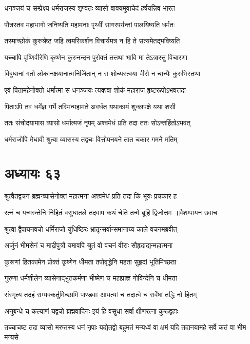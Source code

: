 \twolineshloka
{धनञ्जयं च सम्प्रेक्ष्य धर्मराजस्य शृण्वतः}
{व्यासो वाक्यमुवाचेदं हर्षयन्निव भारत}


\twolineshloka
{पौत्रस्तव महाभागो जनिष्यति महामनाः}
{पृथ्वीं सागरपर्यन्तां पालयिष्यति धर्मतः}


\twolineshloka
{तस्माच्छोकं कुरुश्रेष्ठ जहि त्वमरिकर्शन}
{विचार्यमत्र न हि ते सत्यमेतद्भविष्यति}


\twolineshloka
{यच्चापि वृष्णिवीरेणि कृष्णेन कुरुनन्दन}
{पुरोक्तं तत्तथा भावि मा तेऽत्रास्तु विचारणा}


\twolineshloka
{विबुधानां गतो लोकानक्षयानात्मनिर्जितान्}
{न स शोच्यस्त्वया वीरो न चान्यैः कुरुभिस्तथा}


\twolineshloka
{एवं पितामहेनोक्तो धर्मात्मा स धनञ्जयः}
{त्यक्त्वा शोकं महाराज हृष्टरूपोऽभवत्तदा}


\twolineshloka
{पिताऽपि तव धर्मेज्ञ गर्भे तस्मिन्महामते}
{अवर्धत यथाकामं शुक्लपक्षे यथा शसी}


\twolineshloka
{ततः संचोदयामास व्यासो धर्मात्मजं नृपम्}
{अश्वमेधं प्रति तदा ततः सोऽन्तर्हितोऽभवत्}


\twolineshloka
{धर्मराजोपि मेधावी श्रुत्वा व्यासस्य तद्वचः}
{वित्तोपनयने तात चकार गमने मतिम्}


\chapter{अध्यायः ६३}
\twolineshloka
{श्रुत्वैतद्वचनं ब्रह्मन्व्यासेनोक्तं महात्मना}
{अश्वमेधं प्रति तदा किं भूयः प्रचकार ह}


\threelineshloka
{रत्नं च यन्मरुत्तेनि निहितं वसुधातले}
{तदवाप कथं चेति तन्मे ब्रूहि द्विजोत्तम ॥वैशम्पायन उवाच}
{}


\twolineshloka
{श्रुत्वा द्वैपायनवचो धर्मिराजो युधिष्ठिरः}
{भ्रातॄन्सर्वान्समानाय्य काले वचनमब्रवीत्}


\twolineshloka
{अर्जुनं भीमसेनं च माद्रीपुत्रौ यमावपि}
{श्रुतं वो वचनं वीराः सौहृदाद्यन्महात्मना}


\twolineshloka
{कुरूणां हितकामेन प्रोक्तं कृष्णेन धीमता}
{तपोवृद्धेनि महता सुहृदां भूतिमिच्छता}


\twolineshloka
{गुरुणा धर्मशीलेन व्यासेनाद्भुतकर्मणा}
{भीष्मेण च महाप्राज्ञ गोविन्देनि च धीमता}


\twolineshloka
{संस्मृत्य तदहं सम्यक्कर्तुमिच्छामि पाण्डवाः}
{आयत्यां च तदात्वे च सर्वेषां तद्धि नो हितम्}


\twolineshloka
{अनुबन्धे च कल्याणं यद्वचो ब्रह्मवादिनः}
{इयं हि वसुधा सर्वा क्षीणरत्ना कुरूद्वहाः}


\threelineshloka
{तच्चाचष्ट तदा व्यासो मरुत्तस्य धनं नृपाः}
{यद्येतद्वो बहुमतं मन्यध्वं वा क्षमं यदि}
{तदानयामहे सर्वे कतं वा भीम मन्यसे}


